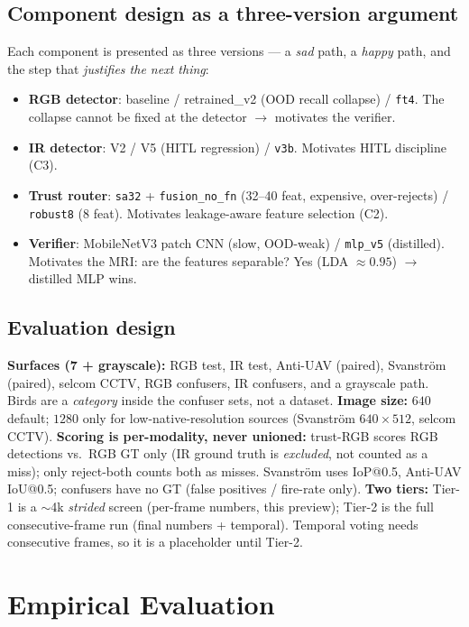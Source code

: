 \documentclass[11pt]{article}
\begin{document}
\subsection{Component design as a three-version argument}
Each component is presented as three versions --- a \emph{sad} path, a \emph{happy} path, and the
step that \emph{justifies the next thing}:
\begin{itemize}[leftmargin=1.4em,itemsep=2pt]
  \item \textbf{RGB detector}: baseline / retrained\_v2 (OOD recall collapse) / \texttt{ft4}.
        The collapse cannot be fixed at the detector $\rightarrow$ motivates the verifier.
  \item \textbf{IR detector}: V2 / V5 (HITL regression) / \texttt{v3b}. Motivates HITL discipline (C3).
  \item \textbf{Trust router}: \texttt{sa32} + \texttt{fusion\_no\_fn} (32--40 feat, expensive, over-rejects)
        / \texttt{robust8} (8 feat). Motivates leakage-aware feature selection (C2).
  \item \textbf{Verifier}: MobileNetV3 patch CNN (slow, OOD-weak) / \texttt{mlp\_v5} (distilled).
        Motivates the MRI: are the features separable? Yes (LDA $\approx0.95$) $\rightarrow$ distilled MLP wins.
\end{itemize}

\subsection{Evaluation design}
\textbf{Surfaces (7 + grayscale):} RGB test, IR test, Anti-UAV (paired), Svanstr\"om (paired),
selcom CCTV, RGB confusers, IR confusers, and a grayscale path. Birds are a \emph{category}
inside the confuser sets, not a dataset.
\textbf{Image size:} $640$ default; $1280$ only for low-native-resolution sources (Svanstr\"om
$640{\times}512$, selcom CCTV).
\textbf{Scoring is per-modality, never unioned:} trust-RGB scores RGB detections vs.\ RGB GT only
(IR ground truth is \emph{excluded}, not counted as a miss); only reject-both counts both as misses.
Svanstr\"om uses IoP@0.5, Anti-UAV IoU@0.5; confusers have no GT (false positives / fire-rate only).
\textbf{Two tiers:} Tier-1 is a $\sim$4k \emph{strided} screen (per-frame numbers, this preview);
Tier-2 is the full consecutive-frame run (final numbers + temporal). Temporal voting needs
consecutive frames, so it is a placeholder until Tier-2.

\section{Empirical Evaluation}
\label{sec:empirical}
\end{document}
